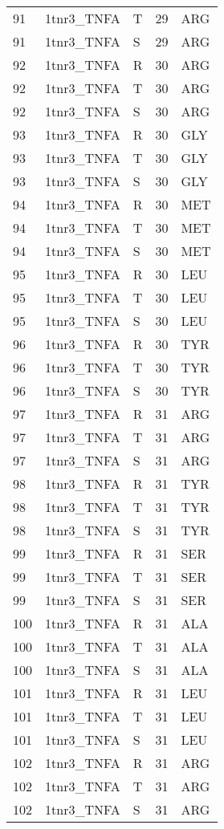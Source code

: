 \begin{tiny}
\begin{longtable}[l]{l|l|l|l|l}
	91 & 1tnr3\_TNFA & T & 29 & ARG \\
	91 & 1tnr3\_TNFA & S & 29 & ARG \\
	92 & 1tnr3\_TNFA & R & 30 & ARG \\
	92 & 1tnr3\_TNFA & T & 30 & ARG \\
	92 & 1tnr3\_TNFA & S & 30 & ARG \\
	93 & 1tnr3\_TNFA & R & 30 & GLY \\
	93 & 1tnr3\_TNFA & T & 30 & GLY \\
	93 & 1tnr3\_TNFA & S & 30 & GLY \\
	94 & 1tnr3\_TNFA & R & 30 & MET \\
	94 & 1tnr3\_TNFA & T & 30 & MET \\
	94 & 1tnr3\_TNFA & S & 30 & MET \\
	95 & 1tnr3\_TNFA & R & 30 & LEU \\
	95 & 1tnr3\_TNFA & T & 30 & LEU \\
	95 & 1tnr3\_TNFA & S & 30 & LEU \\
	96 & 1tnr3\_TNFA & R & 30 & TYR \\
	96 & 1tnr3\_TNFA & T & 30 & TYR \\
	96 & 1tnr3\_TNFA & S & 30 & TYR \\
	97 & 1tnr3\_TNFA & R & 31 & ARG \\
	97 & 1tnr3\_TNFA & T & 31 & ARG \\
	97 & 1tnr3\_TNFA & S & 31 & ARG \\
	98 & 1tnr3\_TNFA & R & 31 & TYR \\
	98 & 1tnr3\_TNFA & T & 31 & TYR \\
	98 & 1tnr3\_TNFA & S & 31 & TYR \\
	99 & 1tnr3\_TNFA & R & 31 & SER \\
	99 & 1tnr3\_TNFA & T & 31 & SER \\
	99 & 1tnr3\_TNFA & S & 31 & SER \\
	100 & 1tnr3\_TNFA & R & 31 & ALA \\
	100 & 1tnr3\_TNFA & T & 31 & ALA \\
	100 & 1tnr3\_TNFA & S & 31 & ALA \\
	101 & 1tnr3\_TNFA & R & 31 & LEU \\
	101 & 1tnr3\_TNFA & T & 31 & LEU \\
	101 & 1tnr3\_TNFA & S & 31 & LEU \\
	102 & 1tnr3\_TNFA & R & 31 & ARG \\
	102 & 1tnr3\_TNFA & T & 31 & ARG \\
	102 & 1tnr3\_TNFA & S & 31 & ARG \\

\end{longtable}
\end{tiny}
